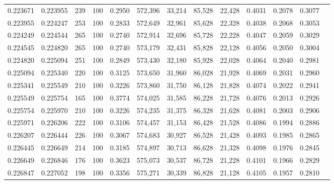 \begin{tabular}{rrrrrrrrrrrrr}
0.223671 & 0.223955 &   239 & 100 &                                     0.2950 & 572,396 &  33,214 &  85,528 &  22,428 & 0.4031 & 0.2078 & 0.3077 \\
0.223955 & 0.224247 &   253 & 100 &                                     0.2833 & 572,649 &  32,961 &  85,628 &  22,328 & 0.4038 & 0.2068 & 0.3053 \\
0.224249 & 0.224544 &   265 & 100 &                                     0.2740 & 572,914 &  32,696 &  85,728 &  22,228 & 0.4047 & 0.2059 & 0.3029 \\
0.224545 & 0.224820 &   265 & 100 &                                     0.2740 & 573,179 &  32,431 &  85,828 &  22,128 & 0.4056 & 0.2050 & 0.3004 \\
0.224820 & 0.225094 &   251 & 100 &                                     0.2849 & 573,430 &  32,180 &  85,928 &  22,028 & 0.4064 & 0.2040 & 0.2981 \\
0.225094 & 0.225340 &   220 & 100 &                                     0.3125 & 573,650 &  31,960 &  86,028 &  21,928 & 0.4069 & 0.2031 & 0.2960 \\
0.225341 & 0.225549 &   210 & 100 &                                     0.3226 & 573,860 &  31,750 &  86,128 &  21,828 & 0.4074 & 0.2022 & 0.2941 \\
0.225549 & 0.225754 &   165 & 100 &                                     0.3774 & 574,025 &  31,585 &  86,228 &  21,728 & 0.4076 & 0.2013 & 0.2926 \\
0.225754 & 0.225970 &   210 & 100 &                                     0.3226 & 574,235 &  31,375 &  86,328 &  21,628 & 0.4081 & 0.2003 & 0.2906 \\
0.225971 & 0.226206 &   222 & 100 &                                     0.3106 & 574,457 &  31,153 &  86,428 &  21,528 & 0.4086 & 0.1994 & 0.2886 \\
0.226207 & 0.226444 &   226 & 100 &                                     0.3067 & 574,683 &  30,927 &  86,528 &  21,428 & 0.4093 & 0.1985 & 0.2865 \\
0.226445 & 0.226649 &   214 & 100 &                                     0.3185 & 574,897 &  30,713 &  86,628 &  21,328 & 0.4098 & 0.1976 & 0.2845 \\
0.226649 & 0.226846 &   176 & 100 &                                     0.3623 & 575,073 &  30,537 &  86,728 &  21,228 & 0.4101 & 0.1966 & 0.2829 \\
0.226847 & 0.227052 &   198 & 100 &                                     0.3356 & 575,271 &  30,339 &  86,828 &  21,128 & 0.4105 & 0.1957 & 0.2810 \\

\end{tabular}
